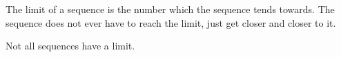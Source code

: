 The limit of a sequence is the number which the
sequence tends towards. The sequence does not
ever have to reach the limit, just get closer
and closer to it.
\par
Not all sequences have a limit.